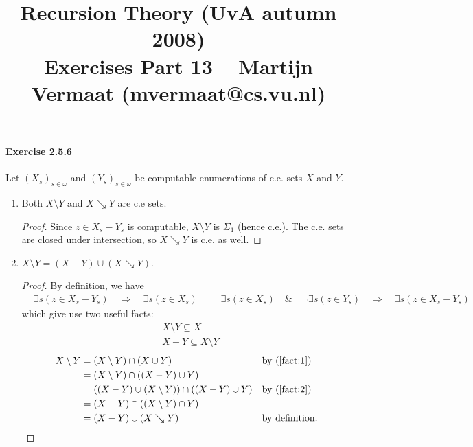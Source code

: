 \documentclass[a4paper,11pt]{article}
\title{Recursion Theory (UvA autumn 2008)\\
\normalsize{Exercises Part 13 -- Martijn Vermaat (mvermaat@cs.vu.nl)}}
\date{}
\begin{document}
\maketitle


\paragraph{Exercise 2.5.6}

Let $(X_s)_{s \in \omega}$ and $(Y_s)_{s \in \omega}$ be computable enumerations of c.e. sets $X$ and $Y$.

\begin{enumerate}[label=(\alph*)]

\item Both $X \setminus Y$ and $X \searrow Y$ are c.e sets.
\begin{proof}
  Since $z \in X_s - Y_s$ is computable, $X \setminus Y$ is $\Sigma_1$ (hence c.e.).
  The c.e. sets are closed under intersection, so $X \searrow Y$ is c.e. as well.
\end{proof}

\item $X \setminus Y = (X - Y) \cup (X \searrow Y)$.
\begin{proof}
  By definition, we have
  \begin{align*}
    & \exists s(z \in X_s - Y_s) \quad\! \Rightarrow \quad\! \exists s(z \in X_s) &&
    & \exists s(z \in X_s) \quad\! \& \quad\! \neg \exists s(z \in Y_s) \quad\! \Rightarrow \quad\! \exists s(z \in X_s - Y_s)
  \end{align*}
  which give use two useful facts:
  \begin{align}
    & X \setminus Y \subseteq X \label{fact:1}\\
    & X - Y \subseteq X \setminus Y \label{fact:2}
  \end{align}
  \begin{align*}
    X \setminus Y & = (X \setminus Y) \cap (X \cup Y)         && \text{by (\ref{fact:1})}\\
    & = (X \setminus Y) \cap ((X - Y) \cup Y)\\
    & = ((X - Y) \cup (X \setminus Y)) \cap ((X - Y) \cup Y)  && \text{by (\ref{fact:2})}\\
    & = (X - Y) \cap ((X \setminus Y) \cap Y)\\
    & = (X - Y) \cup (X \searrow Y)                           && \text{by definition.}\qedhere
  \end{align*}
\end{proof}


\end{enumerate}
\end{document}
